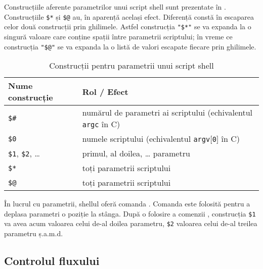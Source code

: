 Construcțiile aferente parametrilor unui script shell sunt prezentate în .
Construcțiile \texttt{\$*} și \texttt{\$@} au, în aparență același efect.
Diferență constă în escaparea celor două construcții prin ghilimele.
Astfel construcția \texttt{"\$*"} se va expanda la o singură valoare care conține spații între parametrii scriptului; în vreme ce construcția \texttt{"\$@"} se va expanda la o listă de valori escapate fiecare prin ghilimele.

\begin{table}[!htb]
  \caption{Construcții pentru parametrii unui script shell}
  \begin{center}
    \begin{tabular}{ p{} p{} }
      \toprule
        \textbf{Nume construcție} &
        \textbf{Rol / Efect} \\
      \midrule
        \texttt{\$\#} &
        numărul de parametri ai scriptului (echivalentul \texttt{argc} în C) \\

        \texttt{\$0} &
        numele scriptului (echivalentul \texttt{argv$[$0$]$} în C) \\

        \texttt{\$1}, \texttt{\$2}, \ldots &
        primul, al doilea, \ldots{} parametru\\

        \texttt{\$*} &
        toți parametrii scriptului\\

        \texttt{\$@} &
        toți parametrii scriptului \\

      \bottomrule
    \end{tabular}
    \label{tab:auto:script-params}
  \end{center}
\end{table}

În lucrul cu parametrii, shellul oferă comanda .
Comanda  este folosită pentru a deplasa parametri o poziție la stânga.
După o folosire a comenzii , construcția \texttt{\$1} va avea acum valoarea celui de-al doilea parametru, \texttt{\$2} valoarea celui de-al treilea parametru ș.a.m.d.

\subsection{Controlul fluxului}
\label{sec:auto:script-func:flow-control}

